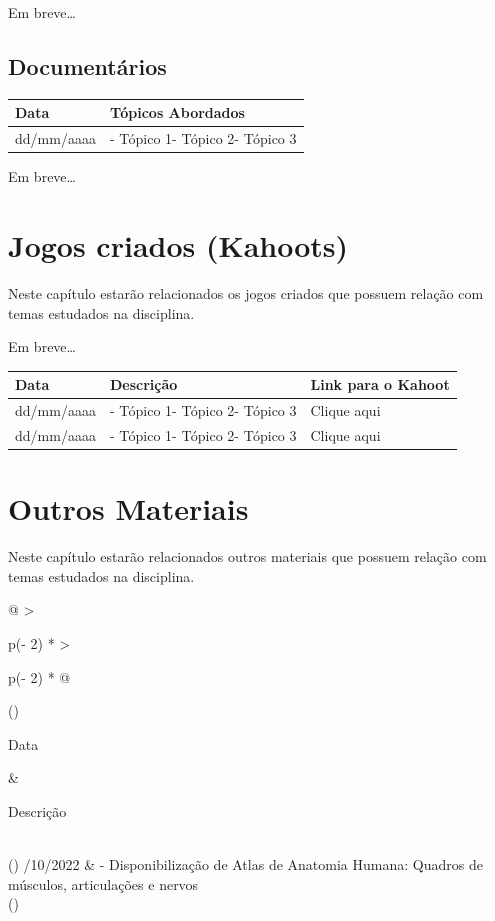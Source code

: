 \documentclass[
]{book}
\begin{document}
Em breve\ldots{}

\hypertarget{documentuxe1rios}{%
\section{Documentários}\label{documentuxe1rios}}

\begin{longtable}[]{@{}ll@{}}
\toprule()
Data & Tópicos Abordados \\
\midrule()
\endhead
dd/mm/aaaa & - Tópico 1- Tópico 2- Tópico 3 \\
\bottomrule()
\end{longtable}

Em breve\ldots{}

\hypertarget{jogos-criados-kahoots}{%
\chapter{Jogos criados (Kahoots)}\label{jogos-criados-kahoots}}

Neste capítulo estarão relacionados os jogos criados que possuem relação com temas estudados na disciplina.

Em breve\ldots{}

\begin{longtable}[]{@{}lll@{}}
\toprule()
Data & Descrição & Link para o Kahoot \\
\midrule()
\endhead
dd/mm/aaaa & - Tópico 1- Tópico 2- Tópico 3 & Clique aqui \\
dd/mm/aaaa & - Tópico 1- Tópico 2- Tópico 3 & Clique aqui \\
\bottomrule()
\end{longtable}

\hypertarget{cap-outros-materiais}{%
\chapter{Outros Materiais}\label{cap-outros-materiais}}

Neste capítulo estarão relacionados outros materiais que possuem relação com temas estudados na disciplina.

\begin{longtable}[]{@{}
  >{\raggedright\arraybackslash}p{(\columnwidth - 2\tabcolsep) * }
  >{\raggedright\arraybackslash}p{(\columnwidth - 2\tabcolsep) * }@{}}
\toprule()
\begin{minipage}[b]{\linewidth}\raggedright
Data
\end{minipage} & \begin{minipage}[b]{\linewidth}\raggedright
Descrição
\end{minipage} \\
\midrule()
/10/2022 & - Disponibilização de Atlas de Anatomia Humana: Quadros de músculos, articulações e nervos \\
\bottomrule()
\end{longtable}
\end{document}
